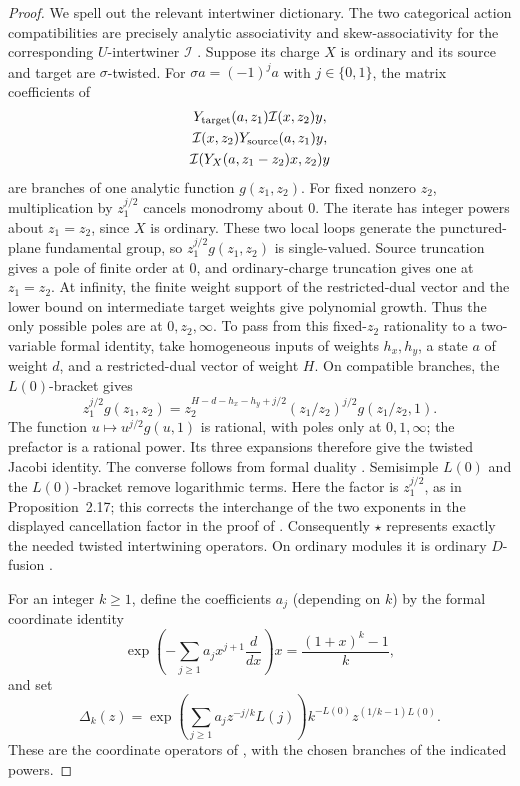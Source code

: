 \begin{proof}
We spell out the relevant intertwiner dictionary.
The two categorical action compatibilities are precisely analytic
associativity and skew-associativity for the corresponding
\(U\)-intertwiner \(\mathcal I\)
\cite[Theorem~3.44 and Proposition~3.50]{CKMExtensions}.
Suppose its charge \(X\) is ordinary and its source and target are
\(\sigma\)-twisted.  For \(\sigma a=(-1)^j a\) with \(j\in\{0,1\}\), the matrix
coefficients of
\[
 \begin{gathered}
 Y_{\rm target}(a,z_1)\mathcal I(x,z_2)y,\\
 \mathcal I(x,z_2)Y_{\rm source}(a,z_1)y,\\
 \mathcal I(Y_X(a,z_1-z_2)x,z_2)y
 \end{gathered}
\]
are branches of one analytic function \(g(z_1,z_2)\).
For fixed nonzero \(z_2\), multiplication by \(z_1^{j/2}\)
cancels monodromy about \(0\).  The iterate has integer powers
about \(z_1=z_2\), since \(X\) is ordinary.  These two local loops
generate the punctured-plane fundamental group, so
\(z_1^{j/2}g(z_1,z_2)\) is single-valued.  Source truncation gives a pole of finite order at \(0\), and
ordinary-charge truncation gives one at \(z_1=z_2\). At infinity,
the finite weight support of the restricted-dual vector and the lower
bound on intermediate target weights give polynomial growth. Thus the
only possible poles are at \(0,z_2,\infty\).
To pass from this fixed-$z_2$ rationality to a two-variable formal
identity, take homogeneous
inputs of weights $h_x,h_y$, a state $a$ of weight $d$, and a
restricted-dual vector of weight $H$. On compatible branches, the
$L(0)$-bracket gives
\[
 z_1^{j/2}g(z_1,z_2)
 =z_2^{H-d-h_x-h_y+j/2}
   (z_1/z_2)^{j/2}g(z_1/z_2,1).
\]
The function $u\mapsto u^{j/2}g(u,1)$ is rational, with poles only at $0,1,\infty$;
the prefactor is a rational power. Its three expansions therefore give
the twisted Jacobi identity. The converse follows from formal duality
\cite[Proposition~2.17]{DLXY}.
Semisimple \(L(0)\) and the \(L(0)\)-bracket remove logarithmic terms.
Here the factor is \(z_1^{j/2}\), as in Proposition~2.17; this corrects
the interchange of the two exponents in the displayed cancellation
factor in the proof of \cite[Theorem~3.5]{DLXY}.
Consequently \(\star\) represents exactly the needed twisted
intertwining operators.  On ordinary modules it is ordinary
\(D\)-fusion \cite[Theorem~3.54 and Corollary~3.55]{CKMExtensions}.

For an integer $k\geq1$, define the coefficients $a_j$ (depending on
$k$) by the formal coordinate identity
\begin{equation}
 \exp\!\left(-\sum_{j\geq1}a_jx^{j+1}\frac{d}{dx}\right)x
       =\frac{(1+x)^k-1}{k},
 \label{eq:permutation-delta-coordinate}
\end{equation}
and set
\begin{equation}
 \Delta_k(z)=\exp\!\left(\sum_{j\geq1}a_jz^{-j/k}L(j)\right)
                 k^{-L(0)}z^{(1/k-1)L(0)}.
 \label{eq:permutation-delta-operator}
\end{equation}
These are the coordinate operators of
\cite[Section~5.1.1, equations~(5.3)--(5.5)]{DLXY}, with the chosen
branches of the indicated powers.


\end{proof}
